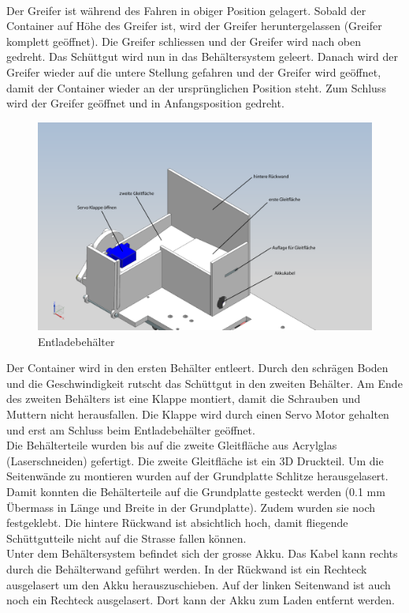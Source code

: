 \\
Der Greifer ist während des Fahren in obiger Position gelagert. Sobald der Container auf Höhe des Greifer ist, wird der Greifer heruntergelassen (Greifer komplett geöffnet). Die Greifer schliessen und der Greifer wird nach oben gedreht. Das Schüttgut wird nun in das Behältersystem geleert. Danach wird der Greifer wieder auf die untere Stellung gefahren und der Greifer wird geöffnet, damit der Container wieder an der ursprünglichen Position steht. Zum Schluss wird der Greifer geöffnet und in Anfangsposition gedreht.\\[0.2cm]
\begin{figure}[H]
\centering
\includegraphics[width=1\textwidth]{03_Loesungskonzept/pictures/entladen11.png}
\caption{Entladebehälter}
\end{figure}
Der Container wird in den ersten Behälter entleert. Durch den schrägen Boden und die Geschwindigkeit rutscht das Schüttgut in den zweiten Behälter. Am Ende des zweiten Behälters ist eine Klappe montiert, damit die Schrauben und Muttern nicht herausfallen. Die Klappe wird durch einen Servo Motor gehalten und erst am Schluss beim Entladebehälter geöffnet.\\[0.2cm]
Die Behälterteile wurden bis auf die zweite Gleitfläche aus Acrylglas (Laserschneiden) gefertigt. Die zweite Gleitfläche ist ein 3D Druckteil.
Um die Seitenwände zu montieren wurden auf der Grundplatte Schlitze herausgelasert. Damit konnten die Behälterteile auf die Grundplatte gesteckt werden (0.1 mm Übermass in Länge und Breite in der Grundplatte). Zudem wurden sie noch festgeklebt. Die hintere Rückwand ist absichtlich hoch, damit fliegende Schüttgutteile nicht auf die Strasse fallen können.\\[0.2cm] 
Unter dem Behältersystem befindet sich der grosse Akku. Das Kabel kann rechts durch die Behälterwand geführt werden. In der Rückwand ist ein Rechteck ausgelasert um den Akku herauszuschieben. Auf der linken Seitenwand ist auch noch ein Rechteck ausgelasert. Dort kann der Akku zum Laden entfernt werden.
